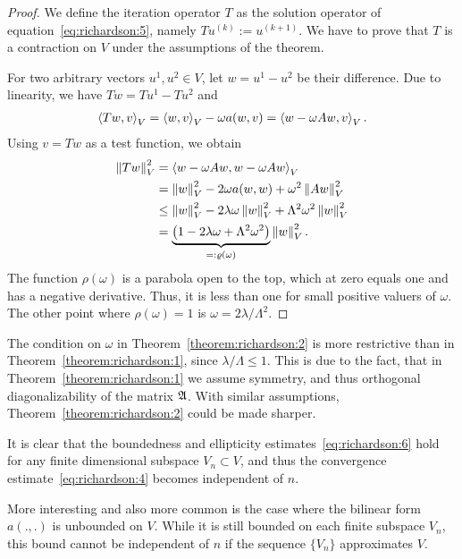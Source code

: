 \begin{proof}
  We define the iteration operator $T$ as the solution operator of
  equation~\eqref{eq:richardson:5}, namely $T u^{(k)} := u^{(k+1)}$. We
  have to prove that $T$ is a contraction on $V$ under the assumptions
  of the theorem.

  For two arbitrary vectors $u^1, u^2 \in V$, let $w = u^1-u^2$ be
  their difference. Due to linearity, we have $T w = T u^1-T u^2$ and
  \begin{gather*}
    \scal(T w,v)_V = \scal(w,v)_V - \omega a(w,v) = \scal(w-\omega A w,v)_V.
  \end{gather*}
  Using $v=Tw$ as a test function, we obtain
  \begin{align*}
    \norm{Tw}_V^2
    & = \scal(w-\omega A w,w-\omega A w)_V \\
    &= \norm{w}_V^2 - 2\omega a(w,w) + \omega^2 \norm{Aw}_V^2\\
    & \le \norm{w}_V^2 - 2\lambda\omega \norm{w}_V^2
    +  \Lambda^2 \omega^2\norm{w}_V^2\\
    & = \underbrace{\bigl(1-2\lambda\omega
      + \Lambda^2\omega^2\bigr)}_{=:\rho(\omega)} \norm{w}_V^2.
  \end{align*}
  The function $\rho(\omega)$ is a parabola open to the top, which
  at zero equals one and has a negative derivative. Thus, it is less
  than one for small positive valuers of $\omega$. The other
  point where $\rho(\omega) = 1$ is $\omega = 2\lambda/\Lambda^2$.
\end{proof}

\begin{note}
  The condition on $\omega$ in Theorem~\ref{theorem:richardson:2} is
  more restrictive than in Theorem~\ref{theorem:richardson:1}, since
  $\lambda/\Lambda \le 1$. This is
  due to the fact, that in Theorem~\ref{theorem:richardson:1} we
  assume symmetry, and thus orthogonal diagonalizability of the matrix
  $\mathfrak{A}$. With similar assumptions,
  Theorem~\ref{theorem:richardson:2} could be made sharper.
\end{note}

\begin{note}
  It is clear that the boundedness and ellipticity
  estimates~\eqref{eq:richardson:6} hold for any finite dimensional
  subspace $V_n\subset V$, and thus the convergence
  estimate~\eqref{eq:richardson:4} becomes independent of $n$.
  
  More interesting and also more common is the case where the bilinear form
  $a(.,.)$ is unbounded on $V$. While it is still bounded on each
  finite subspace $V_n$, this bound cannot be independent of $n$ if
  the sequence $\{V_n\}$ approximates $V$.
\end{note}  

